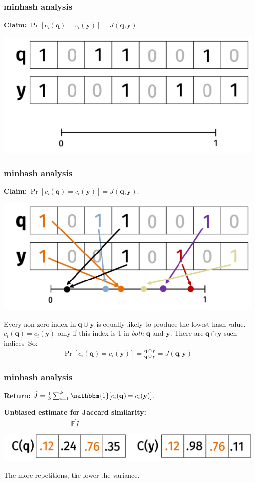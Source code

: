 \documentclass[handout,compress]{beamer}
\newcommand{\bv}[1]{\mathbf{#1}}
\newcommand{\E}{\mathbb{E}}
\begin{document}
\begin{frame}[t]
	\frametitle{minhash analysis}
	\textbf{Claim:} $\Pr[c_i(\bv{q}) = c_i(\bv{y})] = J(\bv{q},\bv{y})$.	
		\begin{center}
			\includegraphics[width=.8\textwidth]{minHashSimple.png}
		\end{center}
\end{frame}

\begin{frame}[t]
	\frametitle{minhash analysis}
	\textbf{Claim:} $\Pr[c_i(\bv{q}) = c_i(\bv{y})] = J(\bv{q},\bv{y})$.	
		\begin{center}
			\includegraphics[width=.8\textwidth]{minhash_colored.png}
		\end{center}
	Every non-zero index in $\bv{q}\cup \bv{y}$ is equally likely to produce the lowest hash value.
	$c_i(\bv{q}) = c_i(\bv{y})$ only if this index is 1 in \emph{both} $\bv{q}$ and $\bv{y}$. There are $\bv{q}\cap \bv{y}$ such indices. So:
	\begin{align*}
		\Pr[c_i(\bv{q}) =c_i(\bv{y})]= \frac{\bv{q}\cap \bv{y}}{\bv{q}\cup \bv{y}}  = J(\bv{q},\bv{y})
	\end{align*}
\end{frame}

\begin{frame}
	\frametitle{minhash analysis}
	\textbf{Return:} $\tilde{J} = \frac{1}{k} \sum_{i=1}^k \mathbbm{1}[c_i(\bv{q}) = c_i(\bv{y})]$. 
	
	\textbf{Unbiased estimate for Jaccard similarity:}
	\begin{align*}
		\E \tilde{J} = \hspace{14em}
	\end{align*}

	\begin{center}
		\includegraphics[width=.6\textwidth]{minHashCompare.png}
	\end{center}
The more repetitions, the lower the variance. 
\end{frame}
\end{document}
